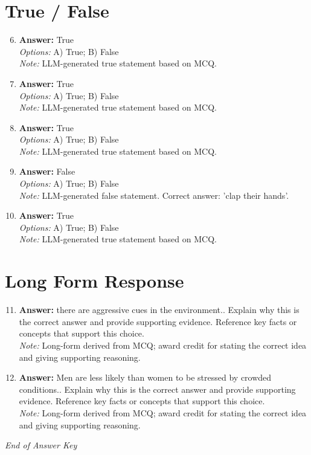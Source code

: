 \documentclass[12pt]{article}
\begin{document}
\section*{True / False}
\begin{enumerate}[label=\arabic*.]
\setcounter{enumi}{5}
\item \textbf{Answer:} True
\\ \textit{Options:} A) True; B) False
\\ \textit{Note:} LLM-generated true statement based on MCQ.
\item \textbf{Answer:} True
\\ \textit{Options:} A) True; B) False
\\ \textit{Note:} LLM-generated true statement based on MCQ.
\item \textbf{Answer:} True
\\ \textit{Options:} A) True; B) False
\\ \textit{Note:} LLM-generated true statement based on MCQ.
\item \textbf{Answer:} False
\\ \textit{Options:} A) True; B) False
\\ \textit{Note:} LLM-generated false statement. Correct answer: 'clap their hands'.
\item \textbf{Answer:} True
\\ \textit{Options:} A) True; B) False
\\ \textit{Note:} LLM-generated true statement based on MCQ.
\end{enumerate}

\section*{Long Form Response}
\begin{enumerate}[label=\arabic*.]
\setcounter{enumi}{10}
\item \textbf{Answer:} there are aggressive cues in the environment.. Explain why this is the correct answer and provide supporting evidence. Reference key facts or concepts that support this choice.
\\ \textit{Note:} Long-form derived from MCQ; award credit for stating the correct idea and giving supporting reasoning.
\item \textbf{Answer:} Men are less likely than women to be stressed by crowded conditions.. Explain why this is the correct answer and provide supporting evidence. Reference key facts or concepts that support this choice.
\\ \textit{Note:} Long-form derived from MCQ; award credit for stating the correct idea and giving supporting reasoning.
\end{enumerate}

\vfill
\noindent\textit{End of Answer Key}
\end{document}
